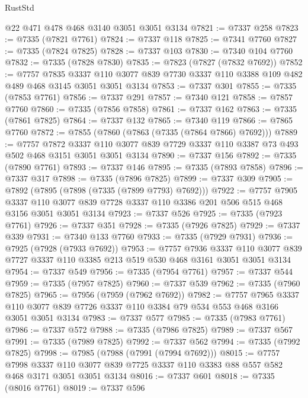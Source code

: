 \begin{lexlean}{RustStd}
\begin{coremodule}
{\begin{coremodule}
{{{{{{{{{{{{{{{{{{{{{{{{{{{{{{{{    @22
    @471
    @478
    @468
    @3140
    @3051
    @3051
    @3134
@7821 := @7337 @258
@7823 := @7335 (@7821 @7761)
@7824 := @7337 @118
@7825 := @7341 @7760
@7827 := @7335 (@7824 @7825)
@7828 := @7337 @103
@7830 := @7340 @104 @7760
@7832 := @7335 (@7828 @7830)
@7835 := @7823 (@7827 (@7832 @7692))
@7852 := @7757
    @7835
    @3337
    @110
    @3077
    @839
    @7730
    @3337
    @110
    @3388
    @109
    @482
    @489
    @468
    @3145
    @3051
    @3051
    @3134
@7853 := @7337 @301
@7855 := @7335 (@7853 @7761)
@7856 := @7337 @291
@7857 := @7340 @121
@7858 := @7857 @7760
@7860 := @7335 (@7856 @7858)
@7861 := @7337 @162
@7863 := @7335 (@7861 @7825)
@7864 := @7337 @132
@7865 := @7340 @119
@7866 := @7865 @7760
@7872 := @7855 (@7860 (@7863 (@7335 (@7864 @7866) @7692)))
@7889 := @7757
    @7872
    @3337
    @110
    @3077
    @839
    @7729
    @3337
    @110
    @3387
    @73
    @493
    @502
    @468
    @3151
    @3051
    @3051
    @3134
@7890 := @7337 @156
@7892 := @7335 (@7890 @7761)
@7893 := @7337 @146
@7895 := @7335 (@7893 @7858)
@7896 := @7337 @317
@7898 := @7335 (@7896 @7825)
@7899 := @7337 @309
@7905 := @7892 (@7895 (@7898 (@7335 (@7899 @7793) @7692)))
@7922 := @7757
    @7905
    @3337
    @110
    @3077
    @839
    @7728
    @3337
    @110
    @3386
    @201
    @506
    @515
    @468
    @3156
    @3051
    @3051
    @3134
@7923 := @7337 @526
@7925 := @7335 (@7923 @7761)
@7926 := @7337 @351
@7928 := @7335 (@7926 @7825)
@7929 := @7337 @339
@7931 := @7340 @133 @7760
@7933 := @7335 (@7929 @7931)
@7936 := @7925 (@7928 (@7933 @7692))
@7953 := @7757
    @7936
    @3337
    @110
    @3077
    @839
    @7727
    @3337
    @110
    @3385
    @213
    @519
    @530
    @468
    @3161
    @3051
    @3051
    @3134
@7954 := @7337 @549
@7956 := @7335 (@7954 @7761)
@7957 := @7337 @544
@7959 := @7335 (@7957 @7825)
@7960 := @7337 @539
@7962 := @7335 (@7960 @7825)
@7965 := @7956 (@7959 (@7962 @7692))
@7982 := @7757
    @7965
    @3337
    @110
    @3077
    @839
    @7726
    @3337
    @110
    @3384
    @79
    @534
    @553
    @468
    @3166
    @3051
    @3051
    @3134
@7983 := @7337 @577
@7985 := @7335 (@7983 @7761)
@7986 := @7337 @572
@7988 := @7335 (@7986 @7825)
@7989 := @7337 @567
@7991 := @7335 (@7989 @7825)
@7992 := @7337 @562
@7994 := @7335 (@7992 @7825)
@7998 := @7985 (@7988 (@7991 (@7994 @7692)))
@8015 := @7757
    @7998
    @3337
    @110
    @3077
    @839
    @7725
    @3337
    @110
    @3383
    @88
    @557
    @582
    @468
    @3171
    @3051
    @3051
    @3134
@8016 := @7337 @601
@8018 := @7335 (@8016 @7761)
@8019 := @7337 @596
}}}}}}}}}}}}}}}}}}}}}}}}}}}}}}}}
\end{coremodule}}
\end{coremodule}
\end{lexlean}
